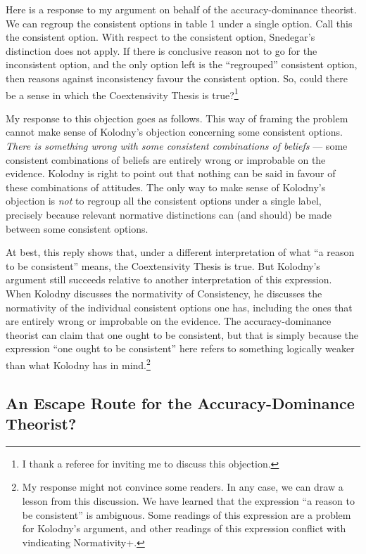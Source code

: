 \documentclass[
]{article}
\begin{document}
Here is a response to my argument on behalf of the accuracy-dominance
theorist. We can regroup the consistent options in table 1 under a
single option. Call this the consistent option. With respect to the
consistent option, Snedegar's distinction does not apply. If there is
conclusive reason not to go for the inconsistent option, and the only
option left is the ``regrouped'' consistent option, then reasons against
inconsistency favour the consistent option. So, could there be a sense
in which the Coextensivity Thesis is true?\footnote{I thank a referee
  for inviting me to discuss this objection.}

My response to this objection goes as follows. This way of framing the
problem cannot make sense of Kolodny's objection concerning some
consistent options. \emph{There is something wrong with some consistent
combinations of beliefs} --- some consistent combinations of beliefs are
entirely wrong or improbable on the evidence. Kolodny is right to point
out that nothing can be said in favour of these combinations of
attitudes. The only way to make sense of Kolodny's objection is
\emph{not} to regroup all the consistent options under a single label,
precisely because relevant normative distinctions can (and should) be
made between some consistent options.

At best, this reply shows that, under a different interpretation of what
``a reason to be consistent'' means, the Coextensivity Thesis is true.
But Kolodny's argument still succeeds relative to another interpretation
of this expression. When Kolodny discusses the normativity of
Consistency, he discusses the normativity of the individual consistent
options one has, including the ones that are entirely wrong or
improbable on the evidence. The accuracy-dominance theorist can claim
that one ought to be consistent, but that is simply because the
expression ``one ought to be consistent'' here refers to something
logically weaker than what Kolodny has in mind.\footnote{My response
  might not convince some readers. In any case, we can draw a lesson
  from this discussion. We have learned that the expression ``a reason
  to be consistent'' is ambiguous. Some readings of this expression are
  a problem for Kolodny's argument, and other readings of this
  expression conflict with vindicating Normativity+.}

\hypertarget{PREFIXan-escape-route-for-the-accuracy-dominance-theorist}{%
\subsection{An Escape Route for the Accuracy-Dominance
Theorist?}\label{PREFIXan-escape-route-for-the-accuracy-dominance-theorist}}
\end{document}
